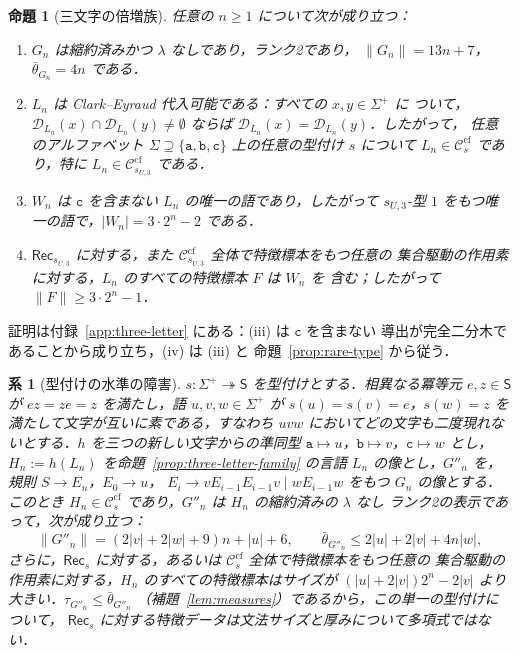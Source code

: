 \documentclass[11pt,a4paper]{ltjsarticle}
\numberwithin{equation}{section}
\theoremstyle{plain}
\newtheorem{proposition}[theorem]{命題}
\newtheorem{corollary}[theorem]{系}
\theoremstyle{definition}
\theoremstyle{remark}
\theoremstyle{plain}
\newcommand{\cf}{\mathrm{cf}}
\newcommand{\Ccf}[1]{\mathcal C_{#1}^{\cf}}
\newcommand{\Rec}{\mathsf{Rec}}
\newcommand{\D}{\mathcal{D}}
\begin{document}
\begin{proposition}[三文字の倍増族]
\label{prop:bracketed-family}
\label{prop:three-letter-family}
任意の $n\ge1$ について次が成り立つ：
\begin{enumerate}[label=\textup{(\roman*)},leftmargin=*]
\item $G_n$ は縮約済みかつ $\lambda$ なしであり，ランク2であり，
$\|G_n\|=13n+7$，$\bar\theta_{G_n}=4n$ である．
\item $L_n$ は Clark--Eyraud 代入可能である：すべての $x,y\in\Sigma^+$ に
ついて，$\D_{L_n}(x)\cap\D_{L_n}(y)\ne\emptyset$ ならば
$\D_{L_n}(x)=\D_{L_n}(y)$．したがって，
任意のアルファベット
$\Sigma\supseteq\{\mathtt a,\mathtt b,\mathtt c\}$ 上の任意の型付け $s$ について $L_n\in\Ccf{s}$
であり，特に $L_n\in\Ccf{s_{U,3}}$ である．
\item $W_n$ は $\mathtt c$ を含まない $L_n$ の唯一の語であり，したがって
$s_{U,3}$-型 $1$ をもつ唯一の語で，$|W_n|=3\cdot2^n-2$ である．
\item $\Rec_{s_{U,3}}$ に対する，また $\Ccf{s_{U,3}}$ 全体で特徴標本をもつ任意の
集合駆動の作用素に対する，$L_n$ のすべての特徴標本 $F$ は $W_n$ を
含む；したがって $\|F\|\ge3\cdot2^n-1$．
\end{enumerate}
\end{proposition}

証明は付録~\ref{app:three-letter} にある：(iii) は $\mathtt c$ を含まない
導出が完全二分木であることから成り立ち，(iv) は (iii) と
命題~\ref{prop:rare-type} から従う．

\begin{corollary}[型付けの水準の障害]
\label{cor:typing-level-obstruction}
$s:\Sigma^+\twoheadrightarrow\mathsf S$ を型付けとする．相異なる冪等元
$e,z\in\mathsf S$ が $ez=ze=z$ を満たし，語 $u,v,w\in\Sigma^+$ が
$s(u)=s(v)=e$，$s(w)=z$ を満たして\emph{文字が互いに素}である，すなわち
$uvw$ においてどの文字も二度現れないとする．$h$ を三つの新しい文字からの準同型
$\mathtt a\mapsto u$，$\mathtt b\mapsto v$，$\mathtt c\mapsto w$ とし，
$H_n:=h(L_n)$ を命題~\ref{prop:three-letter-family} の言語 $L_n$ の像とし，$G''_n$ を，規則 $S\to E_n$，$E_0\to u$，
$E_i\to vE_{i-1}E_{i-1}v\mid wE_{i-1}w$ をもつ $G_n$ の像とする．
このとき $H_n\in\Ccf{s}$ であり，$G''_n$ は $H_n$ の縮約済みの $\lambda$ なし
ランク2の表示であって，次が成り立つ：
\[
 \|G''_n\|=(2|v|+2|w|+9)n+|u|+6,\qquad
 \bar\theta_{G''_n}\le2|u|+2|v|+4n|w|,
\]
さらに，$\Rec_s$ に対する，あるいは $\Ccf{s}$ 全体で特徴標本をもつ任意の
集合駆動の作用素に対する，$H_n$ のすべての特徴標本はサイズが
$(|u|+2|v|)2^n-2|v|$ より大きい．$\tau_{G''_n}\le\bar\theta_{G''_n}$
（補題~\ref{lem:measures}）であるから，この単一の型付けについて，
$\Rec_s$ に対する特徴データは文法サイズと厚みについて多項式ではない．
\end{corollary}
\end{document}
